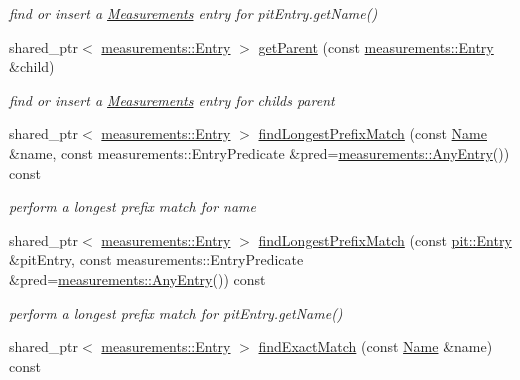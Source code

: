 \begin{DoxyCompactItemize}
\begin{DoxyCompactList}\small\item\em find or insert a \hyperlink{classnfd_1_1Measurements}{Measurements} entry for {\ttfamily pit\+Entry.\+get\+Name()} \end{DoxyCompactList}\item 
shared\+\_\+ptr$<$ \hyperlink{classnfd_1_1measurements_1_1Entry}{measurements\+::\+Entry} $>$ \hyperlink{classnfd_1_1Measurements_ad6328d4a86c7239668946926dd11d8a2}{get\+Parent} (const \hyperlink{classnfd_1_1measurements_1_1Entry}{measurements\+::\+Entry} \&child)
\begin{DoxyCompactList}\small\item\em find or insert a \hyperlink{classnfd_1_1Measurements}{Measurements} entry for child\textquotesingle{}s parent \end{DoxyCompactList}\item 
shared\+\_\+ptr$<$ \hyperlink{classnfd_1_1measurements_1_1Entry}{measurements\+::\+Entry} $>$ \hyperlink{classnfd_1_1Measurements_af200fa0e8d1f7017ab5d13c4c13e925d}{find\+Longest\+Prefix\+Match} (const \hyperlink{classndn_1_1Name}{Name} \&name, const measurements\+::\+Entry\+Predicate \&pred=\hyperlink{classnfd_1_1measurements_1_1AnyEntry}{measurements\+::\+Any\+Entry}()) const\hypertarget{classnfd_1_1Measurements_af200fa0e8d1f7017ab5d13c4c13e925d}{}\label{classnfd_1_1Measurements_af200fa0e8d1f7017ab5d13c4c13e925d}

\begin{DoxyCompactList}\small\item\em perform a longest prefix match for {\ttfamily name} \end{DoxyCompactList}\item 
shared\+\_\+ptr$<$ \hyperlink{classnfd_1_1measurements_1_1Entry}{measurements\+::\+Entry} $>$ \hyperlink{classnfd_1_1Measurements_a515c80c93d03c48bcfca7015e10cb80b}{find\+Longest\+Prefix\+Match} (const \hyperlink{classnfd_1_1pit_1_1Entry}{pit\+::\+Entry} \&pit\+Entry, const measurements\+::\+Entry\+Predicate \&pred=\hyperlink{classnfd_1_1measurements_1_1AnyEntry}{measurements\+::\+Any\+Entry}()) const\hypertarget{classnfd_1_1Measurements_a515c80c93d03c48bcfca7015e10cb80b}{}\label{classnfd_1_1Measurements_a515c80c93d03c48bcfca7015e10cb80b}

\begin{DoxyCompactList}\small\item\em perform a longest prefix match for {\ttfamily pit\+Entry.\+get\+Name()} \end{DoxyCompactList}\item 
shared\+\_\+ptr$<$ \hyperlink{classnfd_1_1measurements_1_1Entry}{measurements\+::\+Entry} $>$ \hyperlink{classnfd_1_1Measurements_a0c50825b26e138cad7194b48a5a3694b}{find\+Exact\+Match} (const \hyperlink{classndn_1_1Name}{Name} \&name) const\hypertarget{classnfd_1_1Measurements_a0c50825b26e138cad7194b48a5a3694b}{}\label{classnfd_1_1Measurements_a0c50825b26e138cad7194b48a5a3694b}


\end{DoxyCompactItemize}
